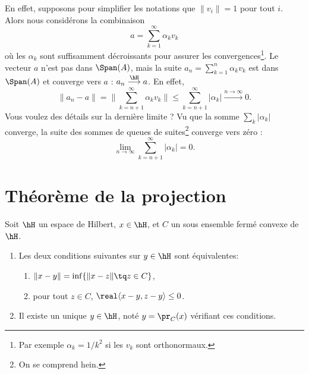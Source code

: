 En effet, supposons pour simplifier les notations que \( \| v_i \|=1\) pour tout \( i\). Alors nous considérons la combinaison
\begin{equation}
    a=\sum_{k=1}^{\infty}\alpha_kv_k
\end{equation}
où les \( \alpha_k\) sont suffisamment décroissants pour assurer les convergences\footnote{Par exemple \( \alpha_k=1/k^2\) si les \( v_k\) sont orthonormaux.}. Le vecteur \( a\) n'est pas dans \( \Span(A)\), mais la suite \( a_n=\sum_{k=1}^{n}\alpha_kv_k\) est dans \( \Span(A)\) et converge vers \( a\) : \( a_n\stackrel{\hH}{\longrightarrow}a\). En effet,
\begin{equation}
    \| a_n-a \|=\| \sum_{k=n+1}^{\infty}\alpha_kv_k \|\leq \sum_{k=n+1}^{\infty}| \alpha_k | \stackrel{n\to\infty}{\longrightarrow}0.
\end{equation}
Vous voulez des détails sur la dernière limite ? Vu que la somme \( \sum_k| \alpha_k |\) converge, la suite des sommes de queues de suites\footnote{On se comprend hein.} converge vers zéro :
\begin{equation}
    \lim_{n\to \infty} \sum_{k=n+1}^{\infty}| \alpha_k |=0.
\end{equation}

\section{Théorème de la projection}

\begin{theorem} \label{ThoProjOrthuzcYkz}
    Soit \( \hH\) un espace de Hilbert, \( x\in \hH\), et \( C\) un sous ensemble fermé convexe de \( \hH\).
    \begin{enumerate}
        \item
            Les deux conditions suivantes sur \( y\in \hH\) sont équivalentes:
    \begin{enumerate}
        \item   \label{ETsfYCSItemi}
            \( \| x-y \|=\inf\{ \| x-z \|\tq z\in C \}\),
        \item\label{ETsfYCSItemii}
            pour tout \( z\in C\), \( \real\langle x-y, z-y\rangle \leq 0\).
    \end{enumerate}
\item
    Il existe un unique \( y\in \hH\), noté \( y=\pr_C(x)\) vérifiant ces conditions.
    \end{enumerate}
\end{theorem}

